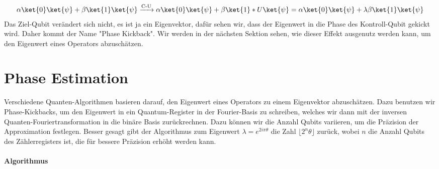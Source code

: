 \begin{align*}
\alpha\ket{0}\ket{\psi} + \beta\ket{1}\ket{\psi} \xrightarrow{\text{C-U}} \alpha\ket{0}\ket{\psi} + \beta\ket{1}*U\ket{\psi} = \alpha\ket{0}\ket{\psi} + \lambda\beta\ket{1}\ket{\psi}
\end{align*}
Das Ziel-Qubit verändert sich nicht, es ist ja ein Eigenvektor, dafür sehen wir, dass der Eigenwert in die Phase des Kontroll-Qubit gekickt wird. Daher kommt der Name "Phase Kickback". Wir werden in der nächsten Sektion sehen, wie dieser Effekt ausgenutz werden kann, um den Eigenwert eines Operators abzuschätzen.

\section{Phase Estimation}
Verschiedene Quanten-Algorithmen basieren darauf, den Eigenwert eines Operators zu einem Eigenvektor abzuschätzen. Dazu benutzen wir Phase-Kickbacks, um den Eigenwert in ein Quantum-Register in der Fourier-Basis zu schreiben, welches wir dann mit der inversen Quanten-Fouriertransformation in die binäre Basis zurückrechnen. Dazu können wir die Anzahl Qubits variieren, um die Präzision der Approximation festlegen. Besser gesagt gibt der Algorithmus zum Eigenwert $\lambda = e^{2i\pi\theta}$ die Zahl $\lfloor{2^n\theta}\rfloor$ zurück, wobei $n$ die Anzahl Qubits des Zählerregisters ist, die für bessere Präzision erhöht werden kann. 
\paragraph{Algorithmus}\mbox{} \newline
